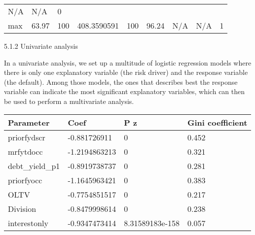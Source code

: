 \begin{longtable}[]{@{}lllllllll@{}}
\begin{minipage}[t]{0.09\columnwidth}
N/A\strut
\end{minipage} & \begin{minipage}[t]{0.08\columnwidth}\raggedright
N/A\strut
\end{minipage} & \begin{minipage}[t]{0.11\columnwidth}\raggedright
0\strut
\end{minipage}\tabularnewline
\begin{minipage}[t]{0.05\columnwidth}\raggedright
max\strut
\end{minipage} & \begin{minipage}[t]{0.08\columnwidth}\raggedright
63.97\strut
\end{minipage} & \begin{minipage}[t]{0.09\columnwidth}\raggedright
100\strut
\end{minipage} & \begin{minipage}[t]{0.09\columnwidth}\raggedright
408.3590591\strut
\end{minipage} & \begin{minipage}[t]{0.08\columnwidth}\raggedright
100\strut
\end{minipage} & \begin{minipage}[t]{0.09\columnwidth}\raggedright
96.24\strut
\end{minipage} & \begin{minipage}[t]{0.09\columnwidth}\raggedright
N/A\strut
\end{minipage} & \begin{minipage}[t]{0.08\columnwidth}\raggedright
N/A\strut
\end{minipage} & \begin{minipage}[t]{0.11\columnwidth}\raggedright
1\strut
\end{minipage}\tabularnewline
\bottomrule
\end{longtable}

5.1.2 Univariate analysis

In a univariate analysis, we set up a multitude of logistic regression
models where there is only one explanatory variable (the risk driver)
and the response variable (the default). Among those models, the ones
that describes best the response variable can indicate the most
significant explanatory variables, which can then be used to perform a
multivariate analysis.

\begin{longtable}[]{@{}llll@{}}
\toprule
Parameter & Coef & P z & Gini coefficient\tabularnewline
\midrule
\endhead
priorfydscr & -0.881726911 & 0 & 0.452\tabularnewline
mrfytdocc & -1.2194863213 & 0 & 0.321\tabularnewline
debt\_yield\_p1 & -0.8919738737 & 0 & 0.281\tabularnewline
priorfyocc & -1.1645963421 & 0 & 0.383\tabularnewline
OLTV & -0.7754851517 & 0 & 0.217\tabularnewline
Division & -0.8479998614 & 0 & 0.238\tabularnewline
interestonly & -0.9347473414 & 8.31589183e-158 & 0.057\tabularnewline
\bottomrule
\end{longtable}

